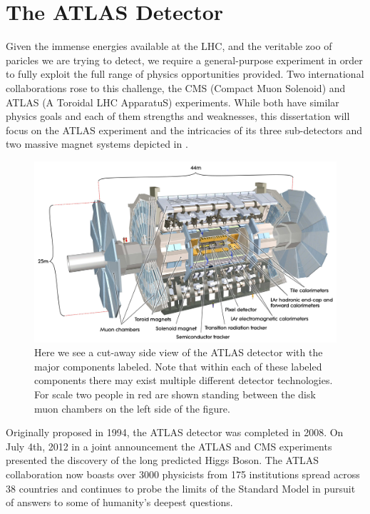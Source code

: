 \chapter{The ATLAS Detector} \label{chap:atlas}

Given the immense energies available at the LHC, and the veritable zoo of
paricles we are trying to detect, we require a general-purpose experiment in
order to fully exploit the full range of physics opportunities provided.  Two
international collaborations rose to this challenge, the CMS (Compact Muon
Solenoid) and ATLAS (A Toroidal LHC ApparatuS) experiments.  While both have
similar physics goals and each of them strengths and weaknesses, this
dissertation will focus on the ATLAS experiment and the intricacies of its three
sub-detectors and two massive magnet systems depicted in
.

\begin{figure}[!htbp]
  \begin{center}
    \includegraphics[width=0.9\linewidth]{figures/atlas/atlas_cutaway.pdf}
    \caption{ \cite{PERF-2007-01} Here we see a cut-away side view of the ATLAS
detector with the major components labeled.  Note that within each of these
labeled components there may exist multiple different detector technologies.
For scale two people in red are shown standing between the disk muon chambers on the
left side of the figure. }
    \label{fig:atlas_cutaway}
  \end{center}
\end{figure}

Originally proposed in 1994, the ATLAS detector was completed in 2008. On
July 4th, 2012 in a joint announcement the ATLAS and CMS experiments presented
the discovery of the long predicted Higgs Boson.  The ATLAS collaboration now boasts
over 3000 physicists from 175 institutions spread across 38 countries and
continues to probe the limits of the Standard Model in pursuit of answers to
some of humanity's deepest questions.


